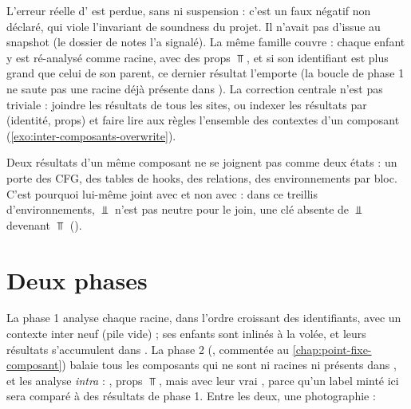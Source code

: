 L'erreur réelle d' est perdue, sans \Info{} ni suspension : c'est un faux négatif non
déclaré, qui viole l'invariant de soundness du projet. Il n'avait pas d'issue au snapshot (le
dossier de notes l'a signalé). La même famille couvre  : chaque enfant y est
ré-analysé comme racine, avec des props $\Top$, et si son identifiant est plus grand que celui
de son parent, ce dernier résultat l'emporte (la boucle de phase 1 ne saute pas une racine déjà
présente dans ). La correction centrale n'est pas triviale : joindre les résultats
de tous les sites, ou indexer les résultats par (identité, props) et faire lire aux règles
l'ensemble des contextes d'un composant (\cref{exo:inter-composants-overwrite}).

\begin{piege}
Deux résultats d'un même composant ne se joignent pas comme deux états : un
 porte des CFG, des tables de hooks, des relations, des environnements par
bloc. C'est pourquoi  lui-même joint avec  et non avec
 : dans ce treillis d'environnements, $\Bot$ n'est pas neutre pour le join,
une clé absente de $\Bot$ devenant $\Top$ ().
\end{piege}

\section{Deux phases}
\label{sec:inter-composants-phases}


La phase 1 analyse chaque racine, dans l'ordre croissant des identifiants, avec un contexte
inter neuf (pile vide) ; ses enfants sont inlinés à la volée, et leurs résultats s'accumulent
dans . La phase 2 (, commentée au
\cref{chap:point-fixe-composant}) balaie tous les composants qui ne sont ni racines ni présents
dans , et les analyse \emph{intra} : , props $\Top$, mais avec
leur vrai , parce qu'un label  minté ici sera comparé à des
résultats de phase 1. Entre les deux, une photographie :


